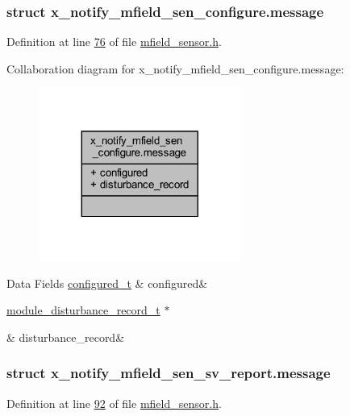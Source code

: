 \subsubsection{struct x\+\_\+notify\+\_\+mfield\+\_\+sen\+\_\+configure.\+message}


Definition at line \hyperlink{a00019_source_l00076}{76} of file \hyperlink{a00019_source}{mfield\+\_\+sensor.\+h}.



Collaboration diagram for x\+\_\+notify\+\_\+mfield\+\_\+sen\+\_\+configure.\+message\+:\nopagebreak
\begin{figure}[H]
\begin{center}
\leavevmode
\includegraphics[width=188pt]{dc/db6/a00955}
\end{center}
\end{figure}
\begin{DoxyFields}{Data Fields}
\hypertarget{a00019_a48e54afcf03ca45bfe38f6b7ff58764a}{\hyperlink{a00021_d6/d9c/a00352}{configured\+\_\+t}}\label{a00019_a48e54afcf03ca45bfe38f6b7ff58764a}
&
configured&
\\
\hline

\hypertarget{a00019_af7361f7710e5f5389134744aaa60254e}{\hyperlink{a00028}{module\+\_\+disturbance\+\_\+record\+\_\+t} $\ast$}\label{a00019_af7361f7710e5f5389134744aaa60254e}
&
disturbance\+\_\+record&
\\
\hline

\end{DoxyFields}
\label{d7/d49/a00863}
\hypertarget{a00019_d7/d49/a00863}{}
\subsubsection{struct x\+\_\+notify\+\_\+mfield\+\_\+sen\+\_\+sv\+\_\+report.\+message}


Definition at line \hyperlink{a00019_source_l00092}{92} of file \hyperlink{a00019_source}{mfield\+\_\+sensor.\+h}.



